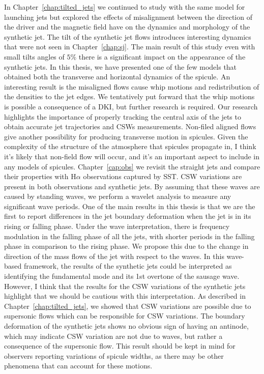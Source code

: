 In Chapter~\ref{chap:tilted_jets} we continued to study with the same model for launching jets but explored the effects of misalignment between the direction of the driver and the magnetic field have on the dynamics and morphology of the synthetic jet. The tilt of the synthetic jet flows introduces interesting dynamics that were not seen in Chapter~\ref{chap:sj}. The main result of this study even with small tilts angles of $5\%$ there is a significant impact on the appearance of the synthetic jets. In this thesis, we have presented one of the few models that obtained both the transverse and horizontal dynamics of the spicule. An interesting result is the misaligned flows cause whip motions and redistribution of the densities to the jet edges. We tentatively put forward that the whip motions is possible a consequence of a DKI, but further research is required. Our research highlights the importance of properly tracking the central axis of the jets to obtain accurate jet trajectories and CSWs measurements. Non-filed aligned flows give another possibility for producing transverse motion in spicules. Given the complexity of the structure of the atmosphere that spicules propagate in, I think it's likely that non-field flow will occur, and it's an important aspect to include in any models of spicules. \np
%
Chapter~\ref{cap:obs} we revisit the straight jets and compare their properties with H$\alpha$ observations captured by SST. CSW variations are present in both observations and synthetic jets. By assuming that these waves are caused by standing waves, we perform a wavelet analysis to measure any significant wave periods. One of the main results in this thesis is that we are the first to report differences in the jet boundary deformation when the jet is in its rising or falling phase. Under the wave interpretation, there is frequency modulation in the falling phase of all the jets, with shorter periods in the falling phase in comparison to the rising phase. We propose this due to the change in direction of the mass flows of the jet with respect to the waves. In this wave-based framework, the results of the synthetic jets could be interpreted as identifying the fundamental mode and its 1st overtone of the sausage wave. However, I think that the results for the CSW variations of the synthetic jets highlight that we should be cautious with this interpretation. As described in Chapter~\ref{chap:tilted_jets}, we showed that CSW variations are possible due to supersonic flows which can be responsible for CSW variations. The boundary deformation of the synthetic jets shows no obvious sign of having an antinode, which may indicate CSW variation are not due to waves, but rather a consequence of the supersonic flow. This result should be kept in mind for observers reporting variations of spicule widths, as there may be other phenomena that can account for these motions. \np
